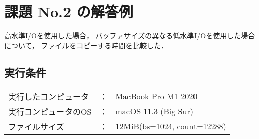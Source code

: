 \documentclass[a4j,twcolumn,11pt,nomag]{ltjarticle}      %
\begin{document}
\onecolumn
\section*{課題 No.2 の解答例}

高水準I/Oを使用した場合，
バッファサイズの異なる低水準I/Oを使用した場合について，
ファイルをコピーする時間を比較した．

\subsection*{実行条件}
  \begin{center}
    \begin{tabular}{l c l}
      実行したコンピュータ & ： & MacBook Pro M1 2020 \\
      実行コンピュータのOS & ： & macOS 11.3 (Big Sur) \\
      ファイルサイズ      & ： & 12MiB(bs=1024, count=12288) \\
    \end{tabular}  
  \end{center}  
\end{document}
